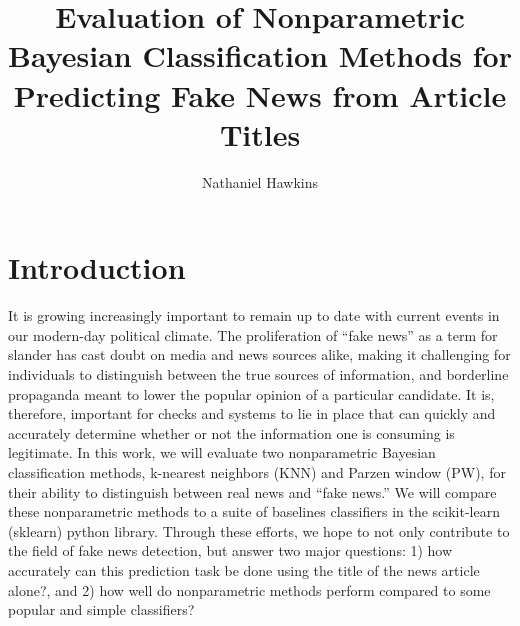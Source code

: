 \documentclass[12pt]{article}
\title{Evaluation of Nonparametric Bayesian Classification Methods for Predicting Fake News from Article Titles}
\author{Nathaniel Hawkins}
\date{}
\begin{document}
	\maketitle
	
	\section{Introduction}
	
    It is growing increasingly important to remain up to date with current events in our modern-day political climate. The proliferation of ``fake news'' as a term for slander has cast doubt on media and news sources alike, making it challenging for individuals to distinguish between the true sources of information, and borderline propaganda meant to lower the popular opinion of a particular candidate. It is, therefore, important for checks and systems to lie in place that can quickly and accurately determine whether or not the information one is consuming is legitimate. In this work, we will evaluate two nonparametric Bayesian classification methods, k-nearest neighbors (KNN) and Parzen window (PW), for their ability to distinguish between real news and ``fake news.'' We will compare these nonparametric methods to a suite of baselines classifiers in the scikit-learn (sklearn) python library. Through these efforts, we hope to not only contribute to the field of fake news detection, but answer two major questions: 1) how accurately can this prediction task be done using the title of the news article alone?, and 2) how well do nonparametric methods perform compared to some popular and simple classifiers?
    
\end{document}
